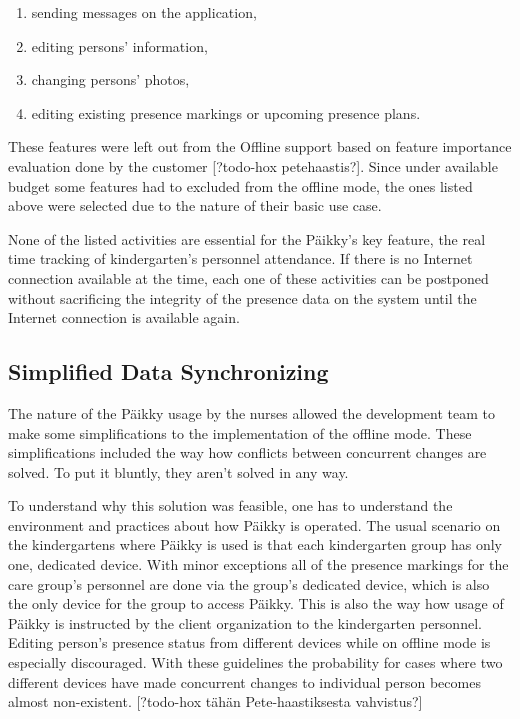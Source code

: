 \begin{enumerate}
    \item sending messages on the application,
    \item editing persons' information,
    \item changing persons' photos,
    \item editing existing presence markings or upcoming presence plans.
\end{enumerate}

These features were left out from the Offline support based on feature importance evaluation done by the customer [?todo-hox petehaastis?]. Since under available budget some features had to excluded from the offline mode, the ones listed above were selected due to the nature of their basic use case.

None of the listed activities are essential for the Päikky's key feature, the real time tracking of kindergarten's personnel attendance. If there is no Internet connection available at the time, each one of these activities can be postponed without sacrificing the integrity of the presence data on the system until the Internet connection is available again.




\subsection{Simplified Data Synchronizing}
The nature of the Päikky usage by the nurses allowed the development team to make some simplifications to the implementation of the offline mode. These simplifications included the way how conflicts between concurrent changes are solved. To put it bluntly, they aren't solved in any way.

To understand why this solution was feasible, one has to understand the environment and practices about how Päikky is operated. The usual scenario on the kindergartens where Päikky is used is that each kindergarten group has only one, dedicated device. With minor exceptions all of the presence markings for the care group's personnel are done via the group's dedicated device, which is also the only device for the group to access Päikky. This is also the way how usage of Päikky is instructed by the client organization to the kindergarten personnel. Editing person's presence status from different devices while on offline mode is especially discouraged. With these guidelines the probability for cases where two different devices have made concurrent changes to individual person becomes almost non-existent. [?todo-hox tähän Pete-haastiksesta vahvistus?]

